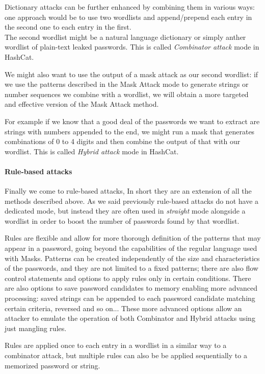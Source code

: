 Dictionary attacks can be further enhanced by combining them in various ways: one approach would be to use two wordlists and append/prepend each entry in the second one to each entry in the first.\\ 
The second wordlist might be a natural language dictionary or simply anther wordlist of plain-text leaked passwords. This is called \emph{Combinator attack} mode in HashCat. 

We might also want to use the output of a mask attack as our second wordlist: if we use the patterns described in the Mask Attack mode to generate strings or number sequences we combine with a wordlist, we will obtain a more targeted and effective version of the Mask Attack method. 

For example if we know that a good deal of the passwords we want to extract are strings with numbers appended to the end, we might run a mask that generates combinations of 0 to 4 digits and then combine the output of that with our wordlist. This is called \emph{Hybrid attack} mode in HashCat.

\paragraph{Rule-based attacks}\label{par:rule-based}
Finally we come to rule-based attacks, In short they are an extension of all the methods described above. 
As we said previously  rule-based attacks do not have a dedicated mode, but instead they are often used in \emph{straight} mode alongside a wordlist in order to boost the number of passwords found by that wordlist.

Rules are flexible and allow for more thorough definition of the patterns that may appear in a password, going beyond the capabilities of the regular language used with Masks.
Patterns can be created independently of the size and characteristics of the passwords, and they are not limited to a fixed patterns; there are also flow control statements and options to apply rules only in certain conditions.
There are also options to save password candidates to memory enabling more advanced processing: saved strings can be appended to each password candidate matching certain criteria, reversed and so on...
These more advanced options allow an attacker to emulate the operation of both Combinator and Hybrid attacks using just mangling rules. 

Rules are applied once to each entry in a wordlist in a similar way to a combinator attack, but multiple rules can also be be applied sequentially to a memorized password or string.

